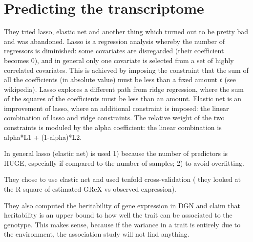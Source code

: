 \documentclass[../main.tex]{subfiles}
\begin{document}



\section{Predicting the transcriptome}

They tried lasso, elastic net and another thing which turned out to be 
pretty bad and was abandoned. Lasso is a regression analysis whereby the 
number of regressors is diminished: some covariates are disregarded 
(their coefficient becomes 0), and in general only one covariate is 
selected from a set of highly correlated covariates. This is achieved by 
imposing the constraint that the sum of all the coefficients (in 
absolute value) must be less than a fixed amount $t$ (see wikipedia). 
Lasso explores a different path from ridge regression, where the sum of 
the squares of the coefficients must be less than an amount. Elastic net 
is an improvement of lasso, where an additional constraint is imposed: 
the linear combination of lasso and ridge constraints. The relative 
weight of the two constraints is moduled by the alpha coefficient: the 
linear combination is alpha*L1 + (1-alpha)*L2.

In general lasso (elastic net) is used 1) because the number of 
predictors is HUGE, especially if compared to the number of samples; 2) 
to avoid overfitting.

They chose to use elastic net and used tenfold cross-validation (\ie 
they looked at the R square of estimated GReX vs observed expression).

They also computed the heritability of gene expression in DGN and claim 
that heritability  is an upper 
bound to how well the trait can be associated to the genotype. This 
makes sense, because if the variance in a trait is entirely due to the 
environment, the association study will not find anything.
\end{document}
